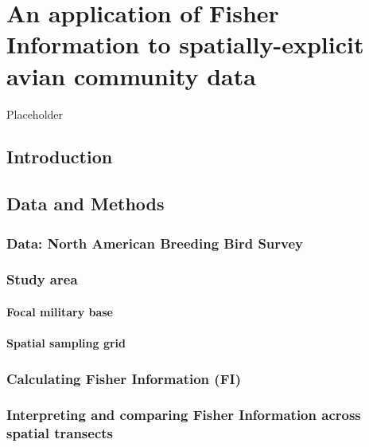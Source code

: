 \documentclass[12pt,twoside,openany]{reedthesis}
\begin{document}
\hypertarget{fisherSpatial}{%
\chapter{An application of Fisher Information to spatially-explicit avian community data}\label{fisherSpatial}}

Placeholder

\hypertarget{introduction-2}{%
\section{Introduction}\label{introduction-2}}

\hypertarget{data-and-methods}{%
\section{Data and Methods}\label{data-and-methods}}

\hypertarget{data-north-american-breeding-bird-survey}{%
\subsection{Data: North American Breeding Bird Survey}\label{data-north-american-breeding-bird-survey}}

\hypertarget{study-area}{%
\subsection{Study area}\label{study-area}}

\hypertarget{focal-military-base}{%
\subsubsection{Focal military base}\label{focal-military-base}}

\hypertarget{spatial-sampling-grid}{%
\subsubsection{Spatial sampling grid}\label{spatial-sampling-grid}}

\hypertarget{calculating-fisher-information-fi}{%
\subsection{Calculating Fisher Information (FI)}\label{calculating-fisher-information-fi}}

\hypertarget{interpreting-and-comparing-fisher-information-across-spatial-transects}{%
\subsection{Interpreting and comparing Fisher Information across spatial transects}\label{interpreting-and-comparing-fisher-information-across-spatial-transects}}
\end{document}
